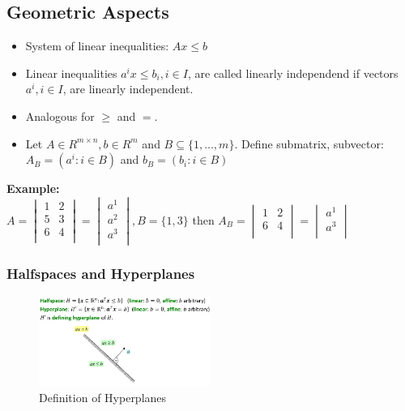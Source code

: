 \subsection{Geometric Aspects}

\begin{itemize}
    \item System of linear inequalities: $Ax \leq b$
    \item Linear inequalities $a^ix \leq b_i, i \in I$, are called linearly independend if vectors $a^i, i \in I$, are linearly independent.
    \item Analogous for $\geq$ and $=$.
    \item Let $A \in R^{m \times n}, b \in R^m$ and $B  \subseteq \{1, ..., m\}$. Define submatrix, subvector: $A_B = (a^i:i\in B)$ and $b_B = (b_i:i \in B)$
\end{itemize}

\textbf{Example:} \\
$A = 
\begin{vmatrix}
1&2 \\
5&3 \\
6&4 \\
\end{vmatrix}
=
\begin{vmatrix}
a^1 \\
a^2 \\
a^3 \\
\end{vmatrix}
,B = \{1,3\}$ then $A_B = 
\begin{vmatrix}
1&2 \\
6&4 \\
\end{vmatrix}
=
\begin{vmatrix}
a^1 \\
a^3 \\
\end{vmatrix}$

\subsubsection{Halfspaces and Hyperplanes}

\begin{figure}[H]
\centering
\includegraphics[width=0.5\textwidth]{figures/hyperplanes.png}
\caption{Definition of Hyperplanes}
\end{figure}

